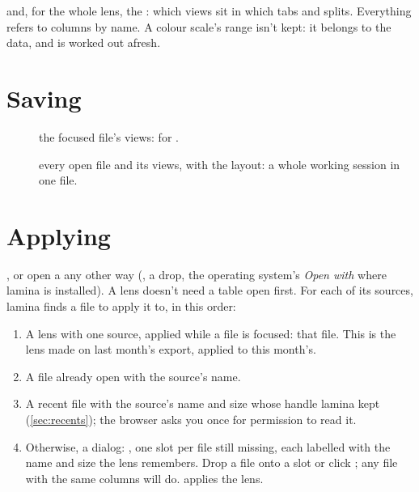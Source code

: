 and, for the whole lens, the : which views sit in which tabs and splits. Everything refers to
columns by name. A colour scale's range isn't kept: it belongs to the data, and is worked out afresh.

\section{Saving}\label{sec:lens-save}

\begin{description}
\item[] the focused file's views:  for
.
\item[] every open file and its views, with the layout: a
whole working session in one file.
\end{description}

\section{Applying}\label{sec:lens-apply}

, or open a  any other way (, a drop, the operating
system's \emph{Open with} where lamina is installed). A lens doesn't need a table open first. For each of
its sources, lamina finds a file to apply it to, in this order:

\begin{enumerate}
\item A lens with one source, applied while a file is focused: that file. This is the lens made on last
month's export, applied to this month's.
\item A file already open with the source's name.
\item A recent file with the source's name and size whose handle lamina kept (\cref{sec:recents}); the
browser asks you once for permission to read it.
\item Otherwise, a dialog: , one slot per file still missing, each
labelled with the name and size the lens remembers. Drop a file onto a slot or click ; any
file with the same columns will do.  applies the lens.
\end{enumerate}


